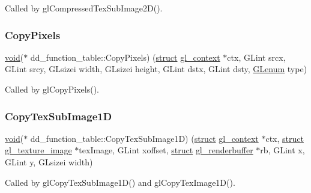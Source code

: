Called by gl\+Compressed\+Tex\+Sub\+Image2\+D(). \mbox{\label{structdd__function__table_ae355c1c39a2145ace1c81e2fb285890b}} 
\subsubsection{\texorpdfstring{Copy\+Pixels}{CopyPixels}}
{\footnotesize\ttfamily \hyperlink{interfacevoid}{void}($\ast$ dd\+\_\+function\+\_\+table\+::\+Copy\+Pixels) (\hyperlink{interfacestruct}{struct} \hyperlink{structgl__context}{gl\+\_\+context} $\ast$ctx, G\+Lint srcx, G\+Lint srcy, G\+Lsizei width, G\+Lsizei height, G\+Lint dstx, G\+Lint dsty, \hyperlink{interfacevoid}{G\+Lenum} type)}

Called by gl\+Copy\+Pixels(). \mbox{\label{structdd__function__table_a1f3b0bba4691f2f2d8338ad804aa948a}} 
\subsubsection{\texorpdfstring{Copy\+Tex\+Sub\+Image1D}{CopyTexSubImage1D}}
{\footnotesize\ttfamily \hyperlink{interfacevoid}{void}($\ast$ dd\+\_\+function\+\_\+table\+::\+Copy\+Tex\+Sub\+Image1D) (\hyperlink{interfacestruct}{struct} \hyperlink{structgl__context}{gl\+\_\+context} $\ast$ctx, \hyperlink{interfacestruct}{struct} \hyperlink{structgl__texture__image}{gl\+\_\+texture\+\_\+image} $\ast$tex\+Image, G\+Lint xoffset, \hyperlink{interfacestruct}{struct} \hyperlink{structgl__renderbuffer}{gl\+\_\+renderbuffer} $\ast$rb, G\+Lint x, G\+Lint y, G\+Lsizei width)}

Called by gl\+Copy\+Tex\+Sub\+Image1\+D() and gl\+Copy\+Tex\+Image1\+D(). \mbox{\label{structdd__function__table_a25e3ba53790920affc41a135e4c5b42b}} 
